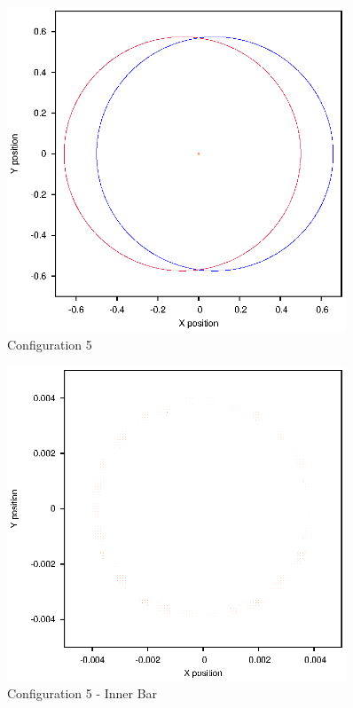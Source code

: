\documentclass[a4paper,12pt]{article}
\begin{document}
\begin{figure}[H]
\centering
\includegraphics[width=0.9\textwidth]{./results/004-55-004/Orbit.eps}
\caption{Configuration 5}
\label{fig:config5}
\end{figure}
\begin{figure}[H]
\centering
\includegraphics[width=0.9\textwidth]{./results/004-55-004/Inner.eps}
\caption{Configuration 5 - Inner Bar}
\label{fig:config5i}
\end{figure}
\end{document}
